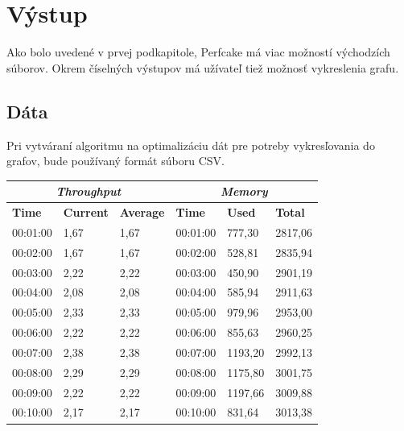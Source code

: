 \section{Výstup}

Ako bolo uvedené v prvej podkapitole, Perfcake má viac možností východzích súborov. Okrem číselných výstupov má užívateľ tiež možnosť vykreslenia grafu.

\subsection{Dáta}
 Pri vytváraní algoritmu na optimalizáciu dát pre potreby vykresľovania do grafov, bude používaný formát súboru CSV.

\begin{table}[htb]
\centering
\begin{tabular}{|l|l|l|l|l|l|}
\hline
\multicolumn{3}{|c|}{\textit{\textbf{Throughput}}}  & \multicolumn{3}{c|}{\textit{\textbf{Memory}}}  \\ \hline
\textbf{Time} & \textbf{Current} & \textbf{Average} & \textbf{Time} & \textbf{Used} & \textbf{Total} \\ \hline
00:01:00      & 1,67             & 1,67             & 00:01:00      & 777,30        & 2817,06        \\ \hline
00:02:00      & 1,67             & 1,67             & 00:02:00      & 528,81        & 2835,94        \\ \hline
00:03:00      & 2,22             & 2,22             & 00:03:00      & 450,90        & 2901,19        \\ \hline
00:04:00      & 2,08             & 2,08             & 00:04:00      & 585,94        & 2911,63        \\ \hline
00:05:00      & 2,33             & 2,33             & 00:05:00      & 979,96        & 2953,00        \\ \hline
00:06:00      & 2,22             & 2,22             & 00:06:00      & 855,63        & 2960,25        \\ \hline
00:07:00      & 2,38             & 2,38             & 00:07:00      & 1193,20       & 2992,13        \\ \hline
00:08:00      & 2,29             & 2,29             & 00:08:00      & 1175,80       & 3001,75        \\ \hline
00:09:00      & 2,22             & 2,22             & 00:09:00      & 1197,66       & 3009,88        \\ \hline
00:10:00      & 2,17             & 2,17             & 00:10:00      & 831,64        & 3013,38        \\ \hline

\end{tabular}
\end{table}
